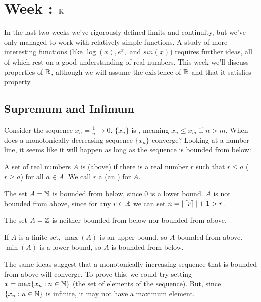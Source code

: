 \documentclass[../notes.tex]{subfiles}
\begin{document}
\section{Week \theweek: \texorpdfstring{$\mathbb R$}{The Reals}}

In the last two weeks we've rigorously defined limits and continuity, but we've only managed to work with relatively simple functions. A study of more interesting functions (like $\log(x), e^x, $ and $sin(x)$) requires further ideas, all of which rest on a good understanding of real numbers. This week we'll discuss properties of $\mathbb R$, although we will assume the existence of $\mathbb R$ and that it satisfies property %

\subsection{Supremum and Infimum}

Consider the sequence $x_n=\frac{1}{n} \to 0$. $\{x_n\}$ is , meaning $x_n \leq x_m$ if $n > m$. When does a monotonically decreasing sequence $\{x_n\}$ converge? Looking at a number line, it seems like it will happen as long as the sequence is bounded from below: 

\begin{definition}
    A set of real numbers $A$ is  (above) if there is a real number $r$ such that $r\leq a$ ($r\geq a$) for all $a\in A$. We call $r$ a  (an ) for $A$.
\end{definition}

\begin{example}
    \begin{listalph}
        \item The set $A=\mathbb N$ is bounded from below, since $0$ is a lower bound. $A$ is not bounded from above, since for any $r\in \mathbb R$ we can set $n = |\left\lceil{r}\right\rceil| + 1 > r$. 
        \item The set $A=\mathbb Z$ is neither bounded from below nor bounded from above.
        \item If $A$ is a finite set, $\max(A)$ is an upper bound, so $A$ bounded from above. $\min(A)$ is a lower bound, so $A$ is bounded from below. 
    \end{listalph}
\end{example}

The same ideas suggest that a monotonically increasing sequence that is bounded from above will converge. To prove this, we could try setting $x=\max\{x_n : n\in \mathbb N\}$ (the set of elements of the sequence). But, since $\{x_n : n\in \mathbb N\}$ is infinite, it may not have a maximum element. 
\end{document}
